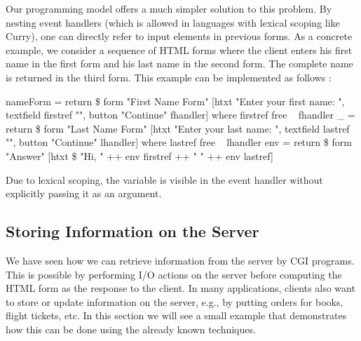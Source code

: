 Our programming model offers a much simpler solution
to this problem. By nesting event handlers
(which is allowed in languages with lexical scoping like Curry),
one can directly refer to input elements in previous forms.
As a concrete example, we consider
a sequence of HTML forms where the client enters
his first name in the first form and his last name in the second form.
The complete name is returned in the third form.
This example can be implemented as follows
:
\begin{prog}
nameForm = return \$ form "First Name Form"
  [htxt "Enter your first name: ", textfield firstref "",
   button "Continue" fhandler]
 where
   firstref free
~
   fhandler _ = return \$ form "Last Name Form"
                 [htxt "Enter your last name: ", textfield lastref "",
                  button "Continue" lhandler]
     where
       lastref free
~
       lhandler env = return \$ form "Answer"
                      [htxt \$ "Hi, " ++ env firstref ++ " " ++ env lastref]
\end{prog}
Due to lexical scoping, the variable 
is visible in the event handler  without explicitly
passing it as an argument.


\subsection{Storing Information on the Server}

We have seen how we can retrieve information from the server
by CGI programs. This is possible by performing I/O actions
on the server before computing the HTML form as the response to
the client. In many applications, clients also want to store
or update information on the server, e.g., by putting orders
for books, flight tickets, etc.
In this section we will see a small example that demonstrates
how this can be done using the already known techniques.

